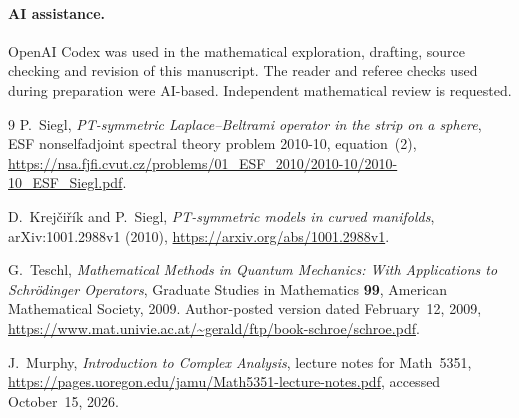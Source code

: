\documentclass[11pt]{article}
\begin{document}
\paragraph{AI assistance.}
OpenAI Codex was used in the mathematical exploration, drafting, source
checking and revision of this manuscript. The reader and referee checks
used during preparation were AI-based. Independent mathematical review
is requested.

\begin{thebibliography}{9}
P.~Siegl, \emph{PT-symmetric Laplace--Beltrami operator in the strip on a
sphere}, ESF nonselfadjoint spectral theory problem 2010-10, equation~(2),
\url{https://nsa.fjfi.cvut.cz/problems/01_ESF_2010/2010-10/2010-10_ESF_Siegl.pdf}.

D.~Krej\v{c}i\v{r}\'{i}k and P.~Siegl,
\emph{PT-symmetric models in curved manifolds},
arXiv:1001.2988v1 (2010),
\url{https://arxiv.org/abs/1001.2988v1}.

G.~Teschl, \emph{Mathematical Methods in Quantum Mechanics: With
Applications to Schr\"odinger Operators}, Graduate Studies in Mathematics
\textbf{99}, American Mathematical Society, 2009.
Author-posted version dated February~12, 2009,
\url{https://www.mat.univie.ac.at/~gerald/ftp/book-schroe/schroe.pdf}.

J.~Murphy, \emph{Introduction to Complex Analysis}, lecture notes for
Math~5351, \url{https://pages.uoregon.edu/jamu/Math5351-lecture-notes.pdf},
accessed October~15, 2026.
\end{thebibliography}
\end{document}
